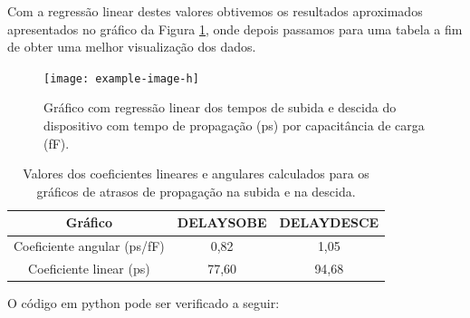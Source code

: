 \documentclass[12pt,a4paper]{article}
\begin{document}
Com a regressão linear destes valores obtivemos os resultados aproximados apresentados no gráfico da Figura \ref{fig:linear_regression}, onde depois passamos para uma tabela a fim de obter uma melhor visualização dos dados.

\begin{figure}[H]
    \centering
    \texttt{[image: example-image-h]}
    \caption{Gráfico com regressão linear dos tempos de subida e descida do dispositivo com tempo de propagação (ps) por capacitância de carga (fF).}
    \label{fig:linear_regression}
\end{figure}

\begin{table}[H]
    \centering
    \caption{Valores dos coeficientes lineares e angulares calculados para os gráficos de atrasos de propagação na subida e na descida.}
    \label{tab:coefficients}
    \begin{tabular}{ccc}
        \toprule
        Gráfico & DELAYSOBE & DELAYDESCE \\
        \midrule
        Coeficiente angular (ps/fF) & 0,82 & 1,05 \\
        Coeficiente linear (ps) & 77,60 & 94,68 \\
        \bottomrule
    \end{tabular}
\end{table}

O código em python pode ser verificado a seguir:
\end{document}
